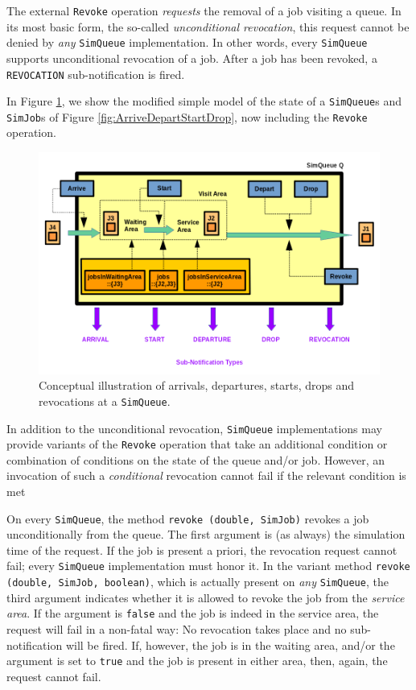 The external \lstinline|Revoke| operation
  {\em requests\/} the removal of a job visiting a queue.
In its most basic form,
  the so-called {\em unconditional revocation},
  this request cannot be denied by {\em any\/}
  \lstinline|SimQueue| implementation.
In other words,
  every \lstinline|SimQueue|
  supports unconditional revocation of a job.
After a job has been revoked,
  a \lstinline|REVOCATION| sub-notification is fired.
  
In Figure \ref{fig:ArriveDepartStartDropRevoke},
  we show the modified simple model of the state of
  a \lstinline|SimQueue|s
  and \lstinline|SimJob|s of Figure \ref{fig:ArriveDepartStartDrop},
  now including the \lstinline|Revoke| operation.

\begin{figure}[!htbp]
\label{fig:ArriveDepartStartDropRevoke}
\caption{Conceptual illustration
         of arrivals, departures, starts, drops and revocations
         at a \texttt{SimQueue}.}
\includegraphics[width=\textwidth]{fig/ArriveDepartStartDropRevoke}
\end{figure}
  
In addition to the unconditional revocation,
  \lstinline|SimQueue| implementations
  may provide variants of the \lstinline|Revoke|
  operation that take an additional condition
  or combination of conditions on the state
  of the queue and/or job.
However,
  an invocation of such a {\em conditional\/}
  revocation cannot fail if
  the relevant condition is met

On every \lstinline|SimQueue|,
  the method \lstinline|revoke (double, SimJob)|
  revokes a job unconditionally from the queue.
The first argument is (as always)
  the simulation time of the request.
If the job is present a priori,
  the revocation request cannot fail;
  every \lstinline|SimQueue| implementation
  must honor it.
In the variant method
  \lstinline|revoke (double, SimJob, boolean)|,
  which is actually present on {\em any} \lstinline|SimQueue|,
  the third argument indicates
  whether it is allowed to revoke the job
  from the {\em service area}.
If the argument is \lstinline|false| and the job is indeed
  in the service area,
  the request will fail in a non-fatal way:
No revocation takes place and
  no sub-notification will be fired.
If, however, the job is in the waiting area,
  and/or the argument is set to \lstinline|true|
  and the job is present in either area,
  then, again, the request cannot fail.

